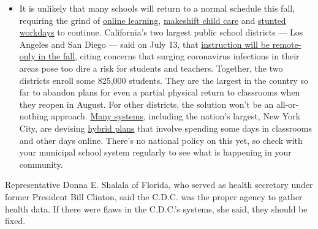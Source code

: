 \begin{itemize}
  \begin{itemize}
  \tightlist
  \item
    It is unlikely that many schools will return to a normal schedule
    this fall, requiring the grind of
    \href{https://www.nytimes3xbfgragh.onion/2020/06/05/us/coronavirus-education-lost-learning.html?action=click\&pgtype=Article\&state=default\&region=MAIN_CONTENT_3\&context=storylines_faq}{online
    learning},
    \href{https://www.nytimes3xbfgragh.onion/2020/05/29/us/coronavirus-child-care-centers.html?action=click\&pgtype=Article\&state=default\&region=MAIN_CONTENT_3\&context=storylines_faq}{makeshift
    child care} and
    \href{https://www.nytimes3xbfgragh.onion/2020/06/03/business/economy/coronavirus-working-women.html?action=click\&pgtype=Article\&state=default\&region=MAIN_CONTENT_3\&context=storylines_faq}{stunted
    workdays} to continue. California's two largest public school
    districts --- Los Angeles and San Diego --- said on July 13, that
    \href{https://www.nytimes3xbfgragh.onion/2020/07/13/us/lausd-san-diego-school-reopening.html?action=click\&pgtype=Article\&state=default\&region=MAIN_CONTENT_3\&context=storylines_faq}{instruction
    will be remote-only in the fall}, citing concerns that surging
    coronavirus infections in their areas pose too dire a risk for
    students and teachers. Together, the two districts enroll some
    825,000 students. They are the largest in the country so far to
    abandon plans for even a partial physical return to classrooms when
    they reopen in August. For other districts, the solution won't be an
    all-or-nothing approach.
    \href{https://bioethics.jhu.edu/research-and-outreach/projects/eschool-initiative/school-policy-tracker/}{Many
    systems}, including the nation's largest, New York City, are
    devising
    \href{https://www.nytimes3xbfgragh.onion/2020/06/26/us/coronavirus-schools-reopen-fall.html?action=click\&pgtype=Article\&state=default\&region=MAIN_CONTENT_3\&context=storylines_faq}{hybrid
    plans} that involve spending some days in classrooms and other days
    online. There's no national policy on this yet, so check with your
    municipal school system regularly to see what is happening in your
    community.
  \end{itemize}
\end{itemize}

Representative Donna E. Shalala of Florida, who served as health
secretary under former President Bill Clinton, said the C.D.C. was the
proper agency to gather health data. If there were flaws in the C.D.C.'s
systems, she said, they should be fixed.

